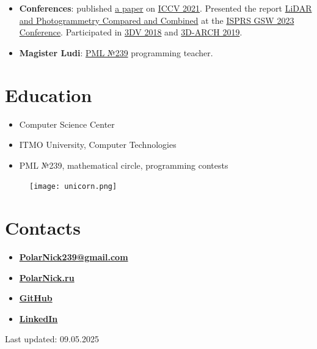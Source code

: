 \documentclass[11pt,oneside]{article}
\newcommand{\hhref}[2]{\href{#1}{\color{blue}#2}}
\begin{document}
\begin{itemize}
    \item{\textbf{Conferences}}: published \hhref{https://www.polarnick.com/static/papers/poliarnyi2021.pdf}{a paper} on \hhref{http://iccv2021.thecvf.com/}{ICCV 2021}. Presented the report \hhref{https://polarnick.com/static/presentations/AgisoftMetashapeGSW2023.pdf}{LiDAR and Photogrammetry Compared and Combined} at the \hhref{https://gsw2023.com/}{ISPRS GSW 2023 Conference}. Participated in \hhref{http://3dv18.uniud.it/}{3DV 2018} and \hhref{http://www.3d-arch.org/}{3D-ARCH 2019}.

    \item{\textbf{Magister Ludi}}: \hhref{http://239.ru}{PML №239} programming teacher.
\end{itemize}

\vspace{-9pt}
\section*{\textbf{Education}}
\vspace{-9pt}

\begin{itemize}
    \item{Computer Science Center}
    \item{ITMO University, Computer Technologies}
    \item{PML №239, mathematical circle, programming contests}
\end{itemize}

\begin{figure}
    \centering
    \texttt{[image: unicorn.png]}
\end{figure}

\vspace{-9pt}
\section*{\textbf{Contacts}}
\vspace{-9pt}

\begin{itemize}

    \item{\textbf{\hhref{mailto:PolarNick239@gmail.com}{PolarNick239@gmail.com}}}

    \item{\textbf{\hhref{http://polarnick239.github.io/index_ru.html}{PolarNick.ru}}}

    \item{\textbf{\hhref{https://github.com/PolarNick239}{GitHub}}}

    \item{\textbf{\hhref{https://www.linkedin.com/in/nikolai-poliarnyi-61393b7b}{LinkedIn}}}

\end{itemize}

Last updated: 09.05.2025
\end{document}
